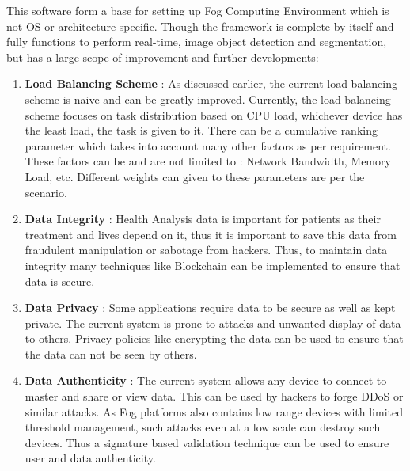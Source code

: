 \documentclass{article}
\begin{document}
This software form a base for setting up Fog Computing Environment which is not OS or architecture specific. Though the framework is complete by itself and fully functions to perform real-time, image object detection and segmentation, but has a large scope of improvement and further developments:
\begin{enumerate}
\item \textbf{Load Balancing Scheme} : As discussed earlier, the current load balancing scheme is naive and can be greatly improved. Currently, the load balancing scheme focuses on task distribution based on CPU load, whichever device has the least load, the task is given to it. There can be a cumulative ranking parameter which takes into account many other factors as per requirement. These factors can be and are not limited to : Network Bandwidth, Memory Load, etc. Different weights can given to these parameters are per the scenario.
\item \textbf{Data Integrity} : Health Analysis data is important for patients as their treatment and lives depend on it, thus it is important to save this data from fraudulent manipulation or sabotage from hackers. Thus, to maintain data integrity many techniques like Blockchain can be implemented to ensure that data is secure. 
\item \textbf{Data Privacy} : Some applications require data to be secure as well as kept private. The current system is prone to attacks and unwanted display of data to others. Privacy policies like encrypting the data can be used to ensure that the data can not be seen by others.
\item \textbf{Data Authenticity} : The current system allows any device to connect to master and share or view data. This can be used by hackers to forge DDoS or similar attacks. As Fog platforms also contains low range devices with limited threshold management, such attacks even at a low scale can destroy such devices. Thus a signature based validation technique can be used to ensure user and data authenticity. 
\end{enumerate}
\end{document}
